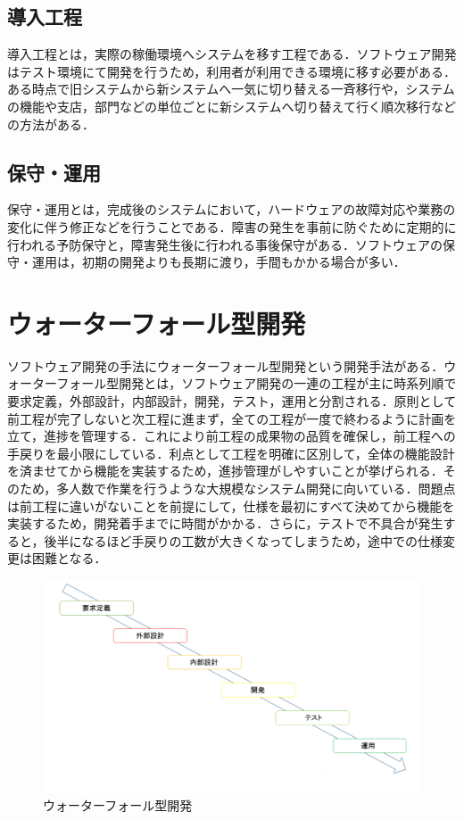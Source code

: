 \subsection{導入工程}
導入工程とは，実際の稼働環境へシステムを移す工程である．ソフトウェア開発はテスト環境にて開発を行うため，利用者が利用できる環境に移す必要がある．ある時点で旧システムから新システムへ一気に切り替える一斉移行や，システムの機能や支店，部門などの単位ごとに新システムへ切り替えて行く順次移行などの方法がある．

\subsection{保守・運用}
保守・運用とは，完成後のシステムにおいて，ハードウェアの故障対応や業務の変化に伴う修正などを行うことである．障害の発生を事前に防ぐために定期的に行われる予防保守と，障害発生後に行われる事後保守がある．ソフトウェアの保守・運用は，初期の開発よりも長期に渡り，手間もかかる場合が多い．

\newpage

\section{ウォーターフォール型開発}
ソフトウェア開発の手法にウォーターフォール型開発という開発手法がある．ウォーターフォール型開発とは，ソフトウェア開発の一連の工程が主に時系列順で要求定義，外部設計，内部設計，開発，テスト，運用と分割される．原則として前工程が完了しないと次工程に進まず，全ての工程が一度で終わるように計画を立て，進捗を管理する．これにより前工程の成果物の品質を確保し，前工程への手戻りを最小限にしている．利点として工程を明確に区別して，全体の機能設計を済ませてから機能を実装するため，進捗管理がしやすいことが挙げられる．そのため，多人数で作業を行うような大規模なシステム開発に向いている．問題点は前工程に違いがないことを前提にして，仕様を最初にすべて決めてから機能を実装するため，開発着手までに時間がかかる．さらに，テストで不具合が発生すると，後半になるほど手戻りの工数が大きくなってしまうため，途中での仕様変更は困難となる\cite{shimizu2012}．

\begin{figure}[htb]
\centering
\includegraphics[width=13cm]{waterfall.png}
\caption{ウォーターフォール型開発}
\end{figure}


